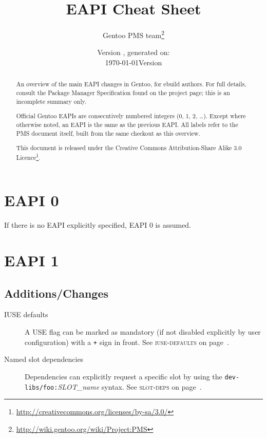 \documentclass[a4paper]{leaflet}
\title{EAPI Cheat Sheet}
\author{Gentoo PMS team\thanks{\url{http://wiki.gentoo.org/wiki/Project:PMS}}}
\date{Version \version{}, generated on: \\\today}
\date{Version \version\\\printdate{\VCDateISO}}
\newcommand{\code}[1]{\texttt{#1}}
\newcommand{\featureref}[1]{\textsc{#1} on page~\pageref{feat:#1}}
\begin{document}
\maketitle
\thispagestyle{empty}
\begin{abstract}
    An overview of the main EAPI changes in Gentoo, for ebuild
    authors.  For full details, consult the Package Manager
    Specification found on the project page; this is
    an incomplete summary only.

    Official Gentoo EAPIs are consecutively numbered integers (0, 1,
    2, \dots).  Except where otherwise noted, an EAPI is the same as
    the previous EAPI.  All labels refer to the PMS document itself,
    built from the same checkout as this overview.


    This document is released under the Creative Commons
    Attribution-Share Alike 3.0
    Licence\footnote{\url{http://creativecommons.org/licenses/by-sa/3.0/}}.
\end{abstract}
\section{EAPI 0}
\label{sec:cs:eapi0}
If there is no EAPI explicitly specified, EAPI 0 is assumed.

\section{EAPI 1}
\label{sec:cs:eapi1}
\subsection{Additions/Changes}
\label{sec:cs:eapi1-additions}
\begin{description}
    \item[IUSE defaults] A USE flag can be marked as mandatory (if
    not disabled explicitly by user configuration) with a \code{+}
    sign in front.  See \featureref{iuse-defaults}.
    \item[Named slot dependencies] Dependencies can explicitly request
    a specific slot by using the
    \code{dev-libs/foo:}\allowbreak\emph{SLOT\_name} syntax.
    See \featureref{slot-deps}.
\end{description}
\end{document}
